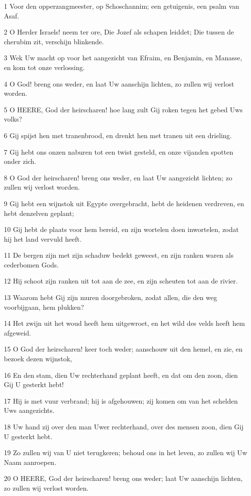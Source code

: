 \par 1 Voor den opperzangmeester, op Schoschannim; een getuigenis, een psalm van Asaf.
\par 2 O Herder Israels! neem ter ore, Die Jozef als schapen leiddet; Die tussen de cherubim zit, verschijn blinkende.
\par 3 Wek Uw macht op voor het aangezicht van Efraim, en Benjamin, en Manasse, en kom tot onze verlossing.
\par 4 O God! breng ons weder, en laat Uw aanschijn lichten, zo zullen wij verlost worden.
\par 5 O HEERE, God der heirscharen! hoe lang zult Gij roken tegen het gebed Uws volks?
\par 6 Gij spijst hen met tranenbrood, en drenkt hen met tranen uit een drieling.
\par 7 Gij hebt ons onzen naburen tot een twist gesteld, en onze vijanden spotten onder zich.
\par 8 O God der heirscharen! breng ons weder, en laat Uw aangezicht lichten; zo zullen wij verlost worden.
\par 9 Gij hebt een wijnstok uit Egypte overgebracht, hebt de heidenen verdreven, en hebt denzelven geplant;
\par 10 Gij hebt de plaats voor hem bereid, en zijn wortelen doen inwortelen, zodat hij het land vervuld heeft.
\par 11 De bergen zijn met zijn schaduw bedekt geweest, en zijn ranken waren als cederbomen Gods.
\par 12 Hij schoot zijn ranken uit tot aan de zee, en zijn scheuten tot aan de rivier.
\par 13 Waarom hebt Gij zijn muren doorgebroken, zodat allen, die den weg voorbijgaan, hem plukken?
\par 14 Het zwijn uit het woud heeft hem uitgewroet, en het wild des velds heeft hem afgeweid.
\par 15 O God der heirscharen! keer toch weder; aanschouw uit den hemel, en zie, en bezoek dezen wijnstok,
\par 16 En den stam, dien Uw rechterhand geplant heeft, en dat om den zoon, dien Gij U gesterkt hebt!
\par 17 Hij is met vuur verbrand; hij is afgehouwen; zij komen om van het schelden Uws aangezichts.
\par 18 Uw hand zij over den man Uwer rechterhand, over des mensen zoon, dien Gij U gesterkt hebt.
\par 19 Zo zullen wij van U niet terugkeren; behoud ons in het leven, zo zullen wij Uw Naam aanroepen.
\par 20 O HEERE, God der heirscharen! breng ons weder; laat Uw aanschijn lichten, zo zullen wij verlost worden.

